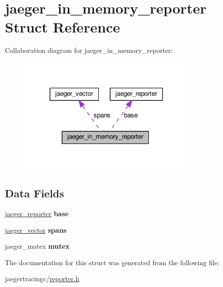 \hypertarget{structjaeger__in__memory__reporter}{}\section{jaeger\+\_\+in\+\_\+memory\+\_\+reporter Struct Reference}
\label{structjaeger__in__memory__reporter}


Collaboration diagram for jaeger\+\_\+in\+\_\+memory\+\_\+reporter\+:\nopagebreak
\begin{figure}[H]
\begin{center}
\leavevmode
\includegraphics[width=254pt]{structjaeger__in__memory__reporter__coll__graph}
\end{center}
\end{figure}
\subsection*{Data Fields}
\begin{DoxyCompactItemize}
\item 
\mbox{\label{structjaeger__in__memory__reporter_a420c17c75738dfa9bf542aa2ead56ffb}} 
\mbox{\hyperlink{structjaeger__reporter}{jaeger\+\_\+reporter}} {\bfseries base}
\item 
\mbox{\label{structjaeger__in__memory__reporter_a97011975d7f93b051764da153deab7d0}} 
\mbox{\hyperlink{structjaeger__vector}{jaeger\+\_\+vector}} {\bfseries spans}
\item 
\mbox{\label{structjaeger__in__memory__reporter_abf881ed3f4f1f4dba522de60831b8bf9}} 
jaeger\+\_\+mutex {\bfseries mutex}
\end{DoxyCompactItemize}


The documentation for this struct was generated from the following file\+:\begin{DoxyCompactItemize}
\item 
jaegertracingc/\mbox{\hyperlink{reporter_8h}{reporter.\+h}}\end{DoxyCompactItemize}
